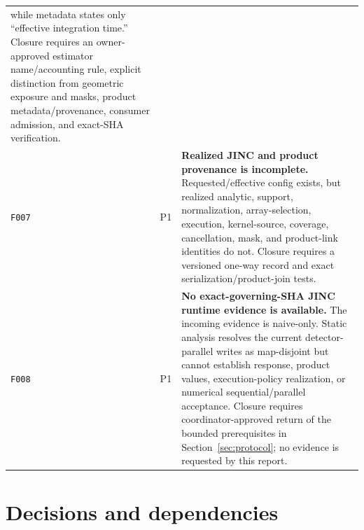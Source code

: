 \documentclass[10pt]{article}
\begin{document}
\begin{longtable}{@{}p{}p{}p{}@{}}
while metadata states only ``effective integration time.''  Closure requires
an owner-approved estimator name/accounting rule, explicit distinction from
geometric exposure and masks, product metadata/provenance, consumer admission,
and exact-SHA verification. \\
\texttt{F007} & P1 & \textbf{Realized JINC and product provenance is
incomplete.}  Requested/effective config exists, but realized analytic,
support, normalization, array-selection, execution, kernel-source, coverage,
cancellation, mask, and product-link identities do not.  Closure requires a
versioned one-way record and exact serialization/product-join tests. \\
\texttt{F008} & P1 & \textbf{No exact-governing-SHA JINC runtime evidence is
available.}  The incoming evidence is naive-only.  Static analysis resolves
the current detector-parallel writes as map-disjoint but cannot establish
response, product values, execution-policy realization, or numerical
sequential/parallel acceptance.  Closure requires coordinator-approved return
of the bounded prerequisites in Section~\ref{sec:protocol}; no evidence is
requested by this report. \\
\bottomrule
\end{longtable}

\section{Decisions and dependencies}
\end{document}

